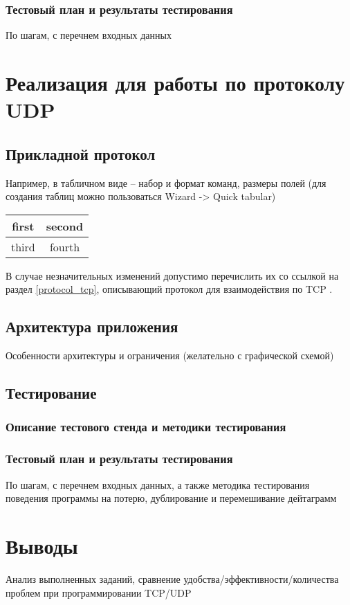 \documentclass[12pt,a4paper]{report}
\begin{document}
\subsection{Тестовый план и результаты тестирования}
По шагам, с перечнем входных данных

\chapter{Реализация для работы по протоколу UDP}
\section{Прикладной протокол}

Например, в табличном виде -- набор и формат команд, размеры полей
(для создания таблиц можно пользоваться Wizard -> Quick tabular)


\begin{tabular}{|c|c|}
\hline 
first & second \\ 
\hline 
third & fourth \\ 
\hline 
\end{tabular} 


В случае незначительных изменений допустимо перечислить их со ссылкой на раздел \ref{protocol_tcp}, описывающий протокол для взаимодействия по TCP .

\section{Архитектура приложения}
Особенности архитектуры и ограничения (желательно с графической схемой) 

\section{Тестирование}
\subsection{Описание тестового стенда и методики тестирования}
\subsection{Тестовый план и результаты тестирования}
По шагам, с перечнем входных данных,
а также  методика тестирования поведения программы на потерю, дублирование и перемешивание дейтаграмм

\chapter{Выводы}
Анализ выполненных заданий, сравнение удобства/эффективности/количества проблем при программировании TCP/UDP
\end{document}
